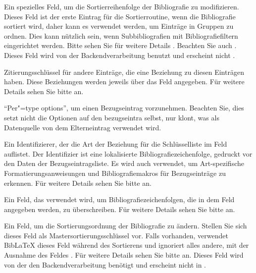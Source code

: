 \documentclass{ltxdockit}[2011/03/25]
\newcommand*{\biblatex}{BibLaTeX\xspace}
\begin{document}
\begin{fieldlist}

Ein spezielles Feld, um die Sortierreihenfolge der Bibliografie zu modifizieren.
Dieses Feld ist der erste Eintrag für die Sortierroutine, wenn die Bibliografie
sortiert wird, daher kann es verwendet werden, um Einträge in Gruppen zu ordnen.
Dies kann nützlich sein, wenn Subbibliografien mit Bibliografiefiltern eingerichtet werden. Bitte sehen Sie für weitere Details  . Beachten Sie auch . Dieses Feld wird von der Backendverarbeitung benutzt
und erscheint nicht .


Zitierungsschlüssel für andere Einträge, die eine Beziehung zu diesen Einträgen haben. Diese Beziehungen werden jeweils über das Feld  angegeben. Für weitere Details sehen Sie bitte   an. 


"`Per"=type options"', um einen Bezugseintrag vorzunehmen.
Beachten Sie, dies setzt nicht die Optionen auf den bezugseintra selbst,
nur  klont, was als Datenquelle von dem Elterneintrag verwendet wird.


Ein Identifizierer, der die Art der Beziehung für die Schlüsselliste im Feld  auflistet. Der Identifizier ist eine lokalisierte
Bibliografiezeichenfolge, gedruckt vor den Daten der Bezugseintragsliste.
Es wird auch verwendet, um Art-spezifische Formatierungsanweisungen
und Bibliografiemakros für Bezugseinträge zu erkennen. Für weitere Details sehen Sie bitte  an.


Ein Feld, das verwendet wird, um Bibliografiezeichenfolgen, die in dem Feld
 angegeben werden, zu überschreiben. Für weitere 
Details sehen Sie bitte  an. 


Ein Feld, um die Sortierungsordnung der Bibliografie zu ändern. Stellen Sie sich dieses Feld als Mastersortierungsschlüssel vor.
Falls vorhanden, verwendet \biblatex dieses Feld während des Sortierens und ignoriert
alles andere, mit der Ausnahme des Feldes . Für weitere 
Details sehen Sie bitte   an. Dieses Feld wird von der
den Backendverarbeitung benötigt und erscheint nicht in .


\end{fieldlist}
\end{document}
